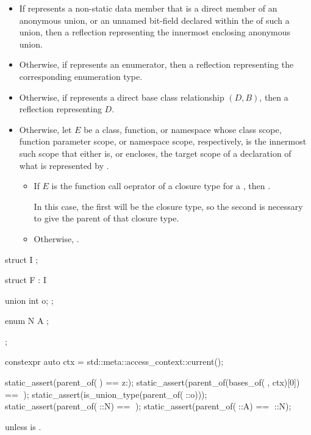 \begin{itemdescr}
\pnum
\returns
\begin{itemize}
\item
  If  represents a non-static data member
  that is a direct member of an anonymous union,
  or an unnamed bit-field declared
  within the  of such a union,
  then a reflection representing the innermost enclosing anonymous union.
\item
  Otherwise, if  represents an enumerator,
  then a reflection representing the corresponding enumeration type.
\item
  Otherwise, if  represents a direct base class relationship $(D, B)$,
  then a reflection representing $D$.
\item
  Otherwise, let $E$ be a class, function, or namespace
  whose class scope, function parameter scope, or namespace scope, respectively,
  is the innermost such scope that either is, or encloses,
  the target scope of a declaration of what is represented by .
  \begin{itemize}
  \item
    If $E$ is the function call oeprator of a closure type
    for a ,
    then .
    \begin{note}
    In this case,
    the first  will be the closure type,
    so the second  is necessary
    to give the parent of that closure type.
    \end{note}
  \item
    Otherwise, .
  \end{itemize}
\end{itemize}
\begin{example}
\begin{codeblock}
struct I { };

struct F : I {
  union {
    int o;
  };

  enum N {
    A
  };
};

constexpr auto ctx = std::meta::access_context::current();

static_assert(parent_of(^^F) == ^^::);
static_assert(parent_of(bases_of(^^F, ctx)[0]) == ^^F);
static_assert(is_union_type(parent_of(^^F::o)));
static_assert(parent_of(^^F::N) == ^^F);
static_assert(parent_of(^^F::A) == ^^F::N);
\end{codeblock}
\end{example}

\pnum
\throws
{} unless
 is .
\end{itemdescr}

